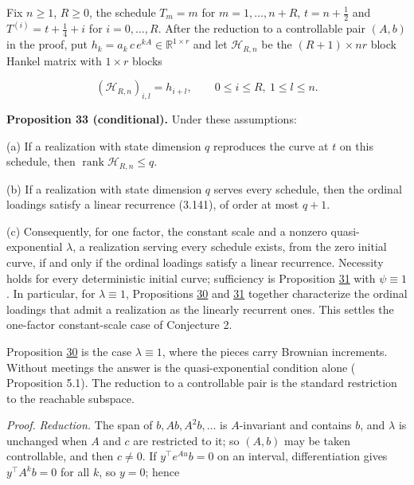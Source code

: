 \documentclass[11pt]{article}
\begin{document}
Fix \(n\ge1\), \(R\ge0\), the schedule \(T_m=m\) for \(m=1,\dots,n+R\), \(t=n+\tfrac12\) and \(T^{(i)}=t+\tfrac14+i\) for \(i=0,\dots,R\). After the reduction to a controllable pair \((A,b)\) in the proof, put \(h_k=a_k\,c\,e^{kA}\in\mathbb R^{1\times r}\) and let \(\mathcal H_{R,n}\) be the \((R+1)\times nr\) block Hankel matrix with \(1\times r\) blocks

\begin{equation*}
(\mathcal H_{R,n})_{i,l}=h_{i+l},\qquad 0\le i\le R,\ 1\le l\le n. \tag{3.150}\label{eq:3.150}
\end{equation*}

\label{res:Proposition-33}
\textbf{Proposition 33 (conditional).} Under these assumptions:

(a) If a realization with state dimension \(q\) reproduces the curve at \(t\) on this schedule, then \(\operatorname{rank}\mathcal H_{R,n}\le q\).

(b) If a realization with state dimension \(q\) serves every schedule, then the ordinal loadings satisfy a linear recurrence (3.141), of order at most \(q+1\).

(c) Consequently, for one factor, the constant scale and a nonzero quasi-exponential \(\lambda\), a realization serving every schedule exists, from the zero initial curve, if and only if the ordinal loadings satisfy a linear recurrence. Necessity holds for every deterministic initial curve; sufficiency is Proposition \hyperref[res:Proposition-31]{31} with \(\psi\equiv1\). In particular, for \(\lambda\equiv1\), Propositions \hyperref[res:Proposition-30]{30} and \hyperref[res:Proposition-31]{31} together characterize the ordinal loadings that admit a realization as the linearly recurrent ones. This settles the one-factor constant-scale case of Conjecture 2.

Proposition \hyperref[res:Proposition-30]{30} is the case \(\lambda\equiv1\), where the pieces carry Brownian increments. Without meetings the answer is the quasi-exponential condition alone (\cite{bjork2001existence} Proposition 5.1). The reduction to a controllable pair is the standard restriction to the reachable subspace.

\emph{Proof.} \emph{Reduction.} The span of \(b,Ab,A^2b,\dots\) is \(A\)-invariant and contains \(b\), and \(\lambda\) is unchanged when \(A\) and \(c\) are restricted to it; so \((A,b)\) may be taken controllable, and then \(c\neq0\). If \(y^\top e^{Au}b=0\) on an interval, differentiation gives \(y^\top A^kb=0\) for all \(k\), so \(y=0\); hence
\end{document}
